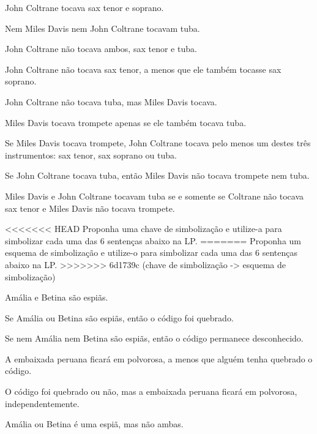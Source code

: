 \begin{earg}
	\item John Coltrane tocava sax tenor e soprano.
	\item Nem Miles Davis nem John Coltrane tocavam tuba.
	\item John Coltrane não tocava ambos, sax tenor e tuba.
	\item John Coltrane não tocava sax tenor, a menos que ele também tocasse sax soprano.
	\item John Coltrane não tocava tuba, mas Miles Davis tocava.
	\item Miles Davis tocava trompete apenas se ele também tocava tuba.
	\item Se Miles Davis tocava trompete, John Coltrane tocava pelo menos um destes três instrumentos: sax tenor, sax soprano ou tuba.
	\item Se John Coltrane tocava tuba, então  Miles Davis não tocava trompete nem tuba.
	\item Miles Davis e John Coltrane tocavam tuba se e somente se Coltrane não tocava sax tenor e Miles Davis não tocava trompete.
\end{earg}

\solutions
\problempart
\label{pr.spies}
<<<<<<< HEAD
Proponha uma chave de simbolização e utilize-a para simbolizar  cada uma das 6 sentenças abaixo na LP.
=======
Proponha um esquema de simbolização e utilize-o para simbolizar  cada uma das 6 sentenças abaixo na LP.
>>>>>>> 6d1739c (chave de simbolização -> esquema de simbolização)
\begin{earg}
	\item Amália e Betina são espiãs.
	\item Se Amália ou Betina são espiãs, então o código foi quebrado.
	\item Se nem Amália nem Betina são espiãs, então o código permanece desconhecido.
	\item A embaixada peruana ficará em polvorosa, a menos que alguém tenha quebrado o código.
	\item O código foi quebrado ou não, mas a embaixada peruana ficará em polvorosa, independentemente.
	\item Amália ou Betina é uma espiã, mas não ambas.
\end{earg}

